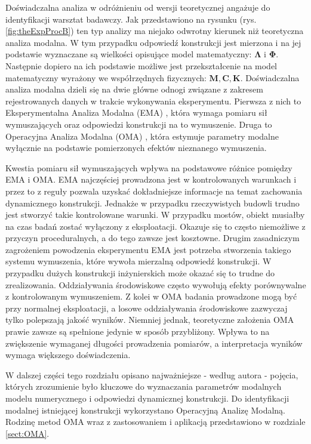 Doświadczalna analiza w odróżnieniu od wersji teoretycznej angażuje do identyfikacji warsztat badawczy. Jak przedstawiono na rysunku (rys. \ref{fig:theExpProcB}) ten typ analizy ma niejako odwrotny kierunek niż teoretyczna analiza modalna. W tym przypadku odpowiedź konstrukcji jest mierzona i na jej podstawie wyznaczane są wielkości opisujące model matematyczny: $\mathbf{\Lambda}$ i $\mathbf{\Phi}$. Następnie dopiero na ich podstawie możliwe jest przekształcenie na model matematyczny wyrażony we współrzędnych fizycznych: $\mathbf{M}, \mathbf{C}, \mathbf{K}$. Doświadczalna analiza modalna dzieli się na dwie główne odnogi związane z zakresem rejestrowanych danych w trakcie wykonywania eksperymentu. Pierwsza z nich to Eksperymentalna Analiza Modalna (EMA) , która wymaga pomiaru sił wymuszających oraz odpowiedzi konstrukcji na to wymuszenie. Druga to Operacyjna Analiza Modalna (OMA) , która estymuje parametry modalne wyłącznie na podstawie pomierzonych efektów nieznanego wymuszenia. 

Kwestia pomiaru sił wymuszających wpływa na podstawowe różnice pomiędzy EMA i OMA. EMA najczęściej prowadzona jest w kontrolowanych warunkach i przez to z reguły pozwala uzyskać dokładniejsze informacje na temat zachowania dynamicznego konstrukcji. Jednakże w przypadku rzeczywistych budowli trudno jest stworzyć takie kontrolowane warunki. W przypadku mostów, obiekt musiałby na czas badań zostać wyłączony z eksploatacji. Okazuje się to często niemożliwe z przyczyn proceduralnych, a do tego zawsze jest kosztowne. Drugim zasadniczym zagrożeniem powodzenia eksperymentu EMA jest potrzeba stworzenia takiego systemu wymuszenia, które wywoła mierzalną odpowiedź konstrukcji. W przypadku dużych konstrukcji inżynierskich może okazać się to trudne do zrealizowania. Oddziaływania środowiskowe często wywołują efekty porównywalne z kontrolowanym wymuszeniem. Z kolei w OMA badania prowadzone mogą być przy normalnej eksploatacji, a losowe oddziaływania środowiskowe zazwyczaj tylko polepszają jakość wyników. Niemniej jednak, teoretyczne założenia OMA prawie zawsze są spełnione jedynie w sposób przybliżony. Wpływa to na zwiększenie wymaganej długości prowadzenia pomiarów, a interpretacja wyników wymaga większego doświadczenia. 

W dalszej części tego rozdziału opisano najważniejsze - według autora - pojęcia, których zrozumienie było kluczowe do wyznaczania parametrów modalnych modelu numerycznego i odpowiedzi dynamicznej konstrukcji. Do identyfikacji modalnej istniejącej konstrukcji wykorzystano Operacyjną Analizę Modalną. Rodzinę metod OMA wraz z zastosowaniem i aplikacją przedstawiono w rozdziale \ref{sect:OMA}.

